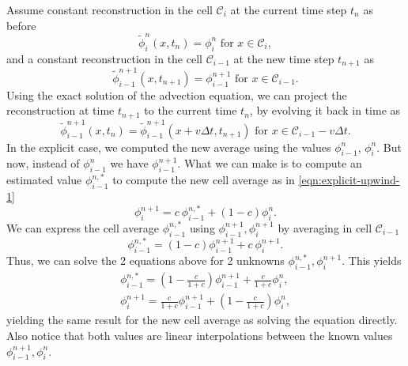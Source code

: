 \documentclass[../thesis.tex]{subfiles}
\begin{document}
Assume constant reconstruction in the cell \(\mathcal{C}_i\) at the current time step \(t_n\)
as before
\[
    \tilde{\phi}_{i}^{n}(x,t_n) = \phi_{i}^{n} \text{ for } x \in \mathcal{C}_i,
\]
and a constant reconstruction in the cell \(\mathcal{C}_{i-1}\) at the new time step \(t_{n+1}\)
as
\[
    \tilde{\phi}_{i-1}^{n+1}(x,t_{n+1}) = \phi_{i-1}^{n+1}
    \text{ for } x \in \mathcal{C}_{i-1}.
\]
Using the exact solution of the advection equation, we can project the reconstruction
at time \(t_{n+1}\) to the current time \(t_{n}\), by evolving it back in time as
\[
    \tilde{\phi}_{i-1}^{n+1}(x,t_{n})
    = \tilde{\phi}_{i-1}^{n+1}(x + v\Delta t,t_{n+1})
    \text{ for } x \in \mathcal{C}_{i-1} - v\Delta t.
\]
In the explicit case, we computed the new average using the values \(\phi_{i-1}^{n}\),
\(\phi_{i}^{n}\). But now, instead of \(\phi_{i-1}^{n}\) we have \(\phi_{i-1}^{n+1}\).
What we can make is to compute an estimated value \(\phi_{i-1}^{n,*}\) to compute
the new cell average as in \eqref{eqn:explicit-upwind-1}
\begin{equation}
    \phi_{i}^{n+1}
    = c~\phi_{i-1}^{n,*}
    + \left( 1 - c \right)\phi_{i}^{n}.
\end{equation}
We can express the cell average \(\phi_{i-1}^{n,*}\) using \(\phi_{i-1}^{n+1}, \phi_{i}^{n+1}\) by averaging in cell \(\mathcal{C}_{i-1}\)
\begin{equation}
    \phi_{i-1}^{n,*}
    = \left( 1-c \right)\phi_{i-1}^{n+1}
    + c~\phi_{i}^{n+1}.
\end{equation}
Thus, we can solve the 2 equations above for 2 unknowns \(\phi_{i-1}^{n,*}, \phi_{i}^{n+1}\). This yields
\begin{equation*}
    \begin{split}
        \phi_{i-1}^{n,*}
        = \left( 1 - \frac{c}{1+c} \right)\phi_{i-1}^{n+1}
        + \frac{c}{1+c}\phi_{i}^{n},
        \\
        \phi_{i}^{n+1}
        = \frac{c}{1+c}\phi_{i-1}^{n+1}
        + \left( 1 - \frac{c}{1+c} \right)\phi_{i}^{n},
    \end{split}
\end{equation*}
yielding the same result for the new cell average as solving the equation directly.
Also notice that both values are linear interpolations between the known values
\(\phi_{i-1}^{n+1}, \phi_{i}^{n}\).
\end{document}
